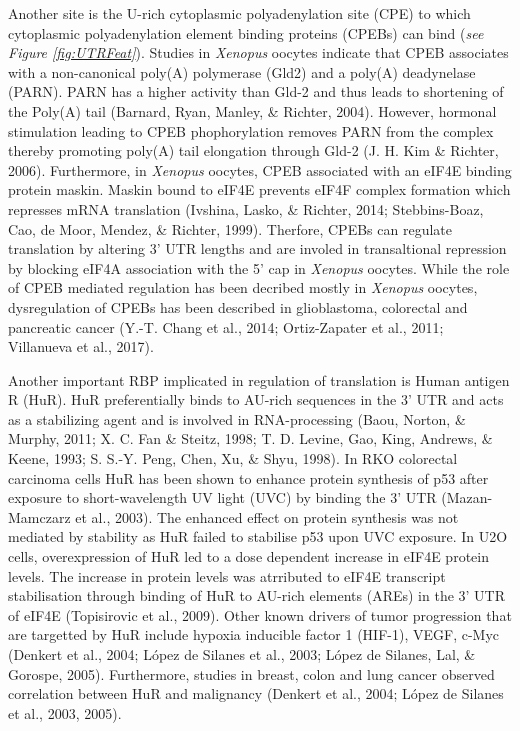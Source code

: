 \documentclass[12pt,openany]{book}
\begin{document}
Another site is the U-rich cytoplasmic polyadenylation site (CPE) to
which cytoplasmic polyadenylation element binding proteins (CPEBs) can
bind (\emph{see Figure \ref{fig:UTRFeat}}). Studies in \emph{Xenopus}
oocytes indicate that CPEB associates with a non-canonical poly(A)
polymerase (Gld2) and a poly(A) deadynelase (PARN). PARN has a higher
activity than Gld-2 and thus leads to shortening of the Poly(A) tail
(Barnard, Ryan, Manley, \& Richter, 2004). However, hormonal stimulation
leading to CPEB phophorylation removes PARN from the complex thereby
promoting poly(A) tail elongation through Gld-2 (J. H. Kim \& Richter,
2006). Furthermore, in \emph{Xenopus} oocytes, CPEB associated with an
eIF4E binding protein maskin. Maskin bound to eIF4E prevents eIF4F
complex formation which represses mRNA translation (Ivshina, Lasko, \&
Richter, 2014; Stebbins-Boaz, Cao, de Moor, Mendez, \& Richter, 1999).
Therfore, CPEBs can regulate translation by altering 3' UTR lengths and
are involed in transaltional repression by blocking eIF4A association
with the 5' cap in \emph{Xenopus} oocytes. While the role of CPEB
mediated regulation has been decribed mostly in \emph{Xenopus} oocytes,
dysregulation of CPEBs has been described in glioblastoma, colorectal
and pancreatic cancer (Y.-T. Chang et al., 2014; Ortiz-Zapater et al.,
2011; Villanueva et al., 2017).

Another important RBP implicated in regulation of translation is Human
antigen R (HuR). HuR preferentially binds to AU-rich sequences in the 3'
UTR and acts as a stabilizing agent and is involved in RNA-processing
(Baou, Norton, \& Murphy, 2011; X. C. Fan \& Steitz, 1998; T. D. Levine,
Gao, King, Andrews, \& Keene, 1993; S. S.-Y. Peng, Chen, Xu, \& Shyu,
1998). In RKO colorectal carcinoma cells HuR has been shown to enhance
protein synthesis of p53 after exposure to short-wavelength UV light
(UVC) by binding the 3' UTR (Mazan-Mamczarz et al., 2003). The enhanced
effect on protein synthesis was not mediated by stability as HuR failed
to stabilise p53 upon UVC exposure. In U2O cells, overexpression of HuR
led to a dose dependent increase in eIF4E protein levels. The increase
in protein levels was atrributed to eIF4E transcript stabilisation
through binding of HuR to AU-rich elements (AREs) in the 3' UTR of eIF4E
(Topisirovic et al., 2009). Other known drivers of tumor progression
that are targetted by HuR include hypoxia inducible factor 1 (HIF-1),
VEGF, c-Myc (Denkert et al., 2004; López de Silanes et al., 2003; López
de Silanes, Lal, \& Gorospe, 2005). Furthermore, studies in breast,
colon and lung cancer observed correlation between HuR and malignancy
(Denkert et al., 2004; López de Silanes et al., 2003, 2005).
\end{document}

